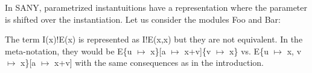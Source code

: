 \documentclass[a4paper]{article}
\newcommand{\tla}[1]{#1}
\begin{document}
In SANY, parametrized instantuitions have a representation where the
parameter is shifted over the instantiation. Let us consider the
modules Foo and Bar:

\begin{parcolumns}{2}
\end{parcolumns}

The term \tla{I(x)!E(x)} is represented as \tla{I!E(x,x)} but they are
not equivalent. In the meta-notation, they would be
E\{u $\mapsto$ x\}[a $\mapsto$ x+v]\{v $\mapsto$ x\} vs. E\{u $\mapsto$ x,
v $\mapsto$ x\}[a $\mapsto$ x+v] with the same consequences as in the
introduction.

\vspace{2cm}
\end{document}
